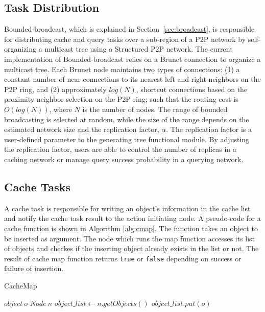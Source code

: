 \documentclass[9.5pt,journal,final,finalsubmission,twocolumn]{IEEEtran}
\begin{document}
\subsection{Task Distribution}\label{sec:task_distribution}
Bounded-broadcast, which is explained in Section~\ref{sec:broadcast}, is responsible for distributing cache and query tasks over a sub-region of a P2P network by self-organizing a multicast tree using a Structured P2P network. The current implementation of Bounded-broadcast relies on a Brunet connection to organize a multicast tree. Each Brunet node maintains two types of connections: (1) a constant number of near connections to its nearest left and right neighbors on the P2P ring, and (2) approximately $log(N)$, shortcut connections based on the proximity neighbor selection on the P2P ring; such that the routing cost is $O(log(N))$, where $N$ is the number of nodes.
The range of bounded broadcasting is selected at random, while the size of 
the range depends on the estimated network size and the replication factor, 
$\alpha$. The replication factor is a user-defined parameter to the 
generating tree functional module. By adjusting the replication factor,
users are able to control the number of replicas in a caching network or
manage query success probability in a querying network.

\subsection{Cache Tasks}
A cache task is responsible for writing an object's information in the cache list and notify the cache task result to the action initiating node. A pseudo-code for a cache function is shown in Algorithm \ref{alg:cmap}.
The function takes an object to be inserted
as argument.
The node which runs the map function accesses its list of objects and
checkes if the inserting object already exists in the list or not.
The result of cache map function returns \texttt{true} or \texttt{false}
depending on success or failure of insertion.
\begin{algorithm}
\caption{CacheMap}
\label{alg:cmap}
\begin{algorithmic}[1]
\REQUIRE $object~ o$     
\REQUIRE $Node~ n$
\STATE $object\_list \leftarrow n.getObjects()$ %
  \STATE $object\_list.put(o)$
  \RETURN \TRUE
\ELSE
  \RETURN \FALSE
\ENDIF
\end{algorithmic}
\end{algorithm}
\end{document}
